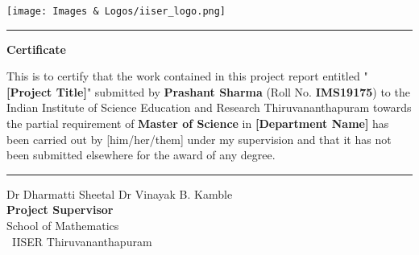 
\thispagestyle{plain}


 \flushleft
 \texttt{[image: Images \& Logos/iiser\_logo.png]}

\vspace{0.5\baselineskip}
\hrule
\vspace{3\baselineskip}

\begin{center}
{\Large {\bf Certificate}}
\end{center}

\vspace{\baselineskip}

\noindent This is to certify that the work contained in this project report entitled
"\textbf{[Project Title]}" submitted by \textbf{Prashant Sharma} (Roll No. \textbf{IMS19175}) to the Indian Institute of Science Education and Research Thiruvananthapuram towards the partial requirement of {\bf Master of Science} in \textbf{[Department Name]} has been carried out by {[him/her/them]} under my supervision and that it has not been submitted elsewhere for the award of any degree.

\vspace{3\baselineskip}
\begin{flushright}
\begin{minipage}[c]{0.45\textwidth}
\centering
\vspace{3\baselineskip}
\hrule
\vspace{1.5\baselineskip}
{\large Dr Dharmatti Sheetal  Dr Vinayak B. Kamble} \bigskip\\
{\large \bf Project Supervisor} \\
\large School of Mathematics~\\\
IISER Thiruvananthapuram
\end{minipage}
\end{flushright}
\vspace{\baselineskip}
\restoregeometry

